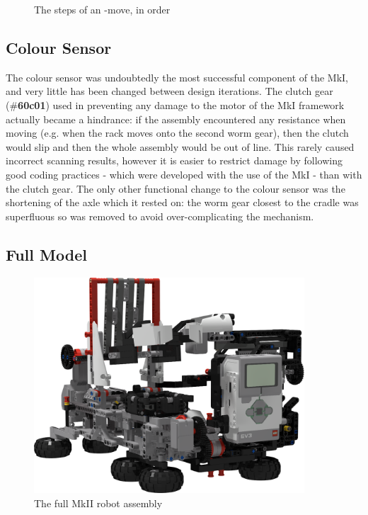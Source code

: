 \documentclass{report}
\newcommand{\tbo}[1]{\textbf{#1}}
\newcommand{\legopiece}[1]{(\#\tbo{#1})}
\newcommand{\move}[1]{\uppercase{\texttt{\formatmovesnospace{#1}}}-move}
\begin{document}
\begin{figure}[H]
\begin{subfigure}[b]{0.25\textwidth}
    		\caption{}
    		\label{fig:rdrXMoveArmRaised}
    	\end{subfigure}
    	\caption{The steps of an \move{x}, in order}
    	\label{fig:rdrXMoveRenders}
    \end{figure}
    
    
    \subsection{Colour Sensor}
    
    The colour sensor was undoubtedly the most successful component of the MkI, and very little has been changed between design iterations. The clutch gear \legopiece{60c01} used in preventing any damage to the motor of the MkI framework actually became a hindrance: if the assembly encountered any resistance when moving (e.g. when the rack moves onto the second worm gear), then the clutch would slip and then the whole assembly would be out of line. This rarely caused incorrect scanning results, however it is easier to restrict damage by following good coding practices - which were developed with the use of the MkI - than with the clutch gear. The only other functional change to the colour sensor was the shortening of the axle which it rested on: the worm gear closest to the cradle was superfluous so was removed to avoid over-complicating the mechanism.
    
    \subsection{Full Model}
    
   	\begin{figure}[H]
    	\centering
   		\includegraphics[width=0.9\textwidth]{Resources/Images/rdrMkIIFull.png}
   		\caption{The full MkII robot assembly}
   		\label{fig:rdrMkIIFull}
    \end{figure}
    
\end{document}
